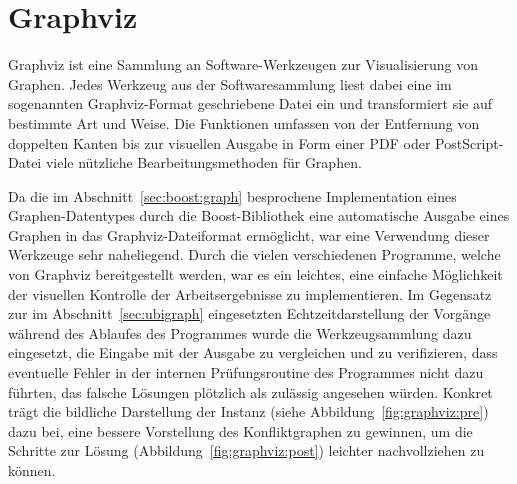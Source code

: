 \section{Graphviz}
Graphviz ist eine Sammlung an Software-Werkzeugen zur Visualisierung von Graphen. Jedes Werkzeug aus der Softwaresammlung liest dabei eine im sogenannten Graphviz-Format ge\-schriebene Datei ein und transformiert
sie auf bestimmte Art und Weise. Die Funktionen umfassen von der Entfernung von doppelten Kanten bis zur visuellen Ausgabe in Form einer PDF oder PostScript-Datei viele nützliche Bearbeitungsmethoden für 
Graphen. 

Da die im Abschnitt~\ref{sec:boost:graph} besprochene Implementation eines Graphen-Datentypes durch die Boost-Bibliothek eine automatische Ausgabe eines Graphen in das Graphviz-Dateiformat er\-möglicht, war 
eine Verwendung dieser Werkzeuge sehr naheliegend. Durch die vielen verschiedenen Programme, welche von Graphviz bereitgestellt werden, war es ein leichtes, eine einfache Möglichkeit der visuellen Kontrolle
der Arbeitsergebnisse zu implementieren. Im Gegensatz zur im Abschnitt~\ref{sec:ubigraph} eingesetzten Echtzeitdarstellung der Vorgänge während des Ablaufes des Programmes wurde die Werkzeugsammlung dazu eingesetzt,
die Eingabe mit der Ausgabe zu vergleichen und zu verifizieren, dass eventuelle Fehler in der internen Prüfungsroutine des Programmes nicht dazu führten, das falsche Lösungen plötzlich als zulässig angesehen würden. Konkret trägt die bildliche Darstellung der Instanz (siehe Abbildung~\ref{fig:graphviz:pre}) dazu bei, eine bessere Vorstellung des Konfliktgraphen zu gewinnen, um die Schritte zur Lösung (Abbildung~\ref{fig:graphviz:post}) lei\-ch\-ter nachvollziehen zu können.

